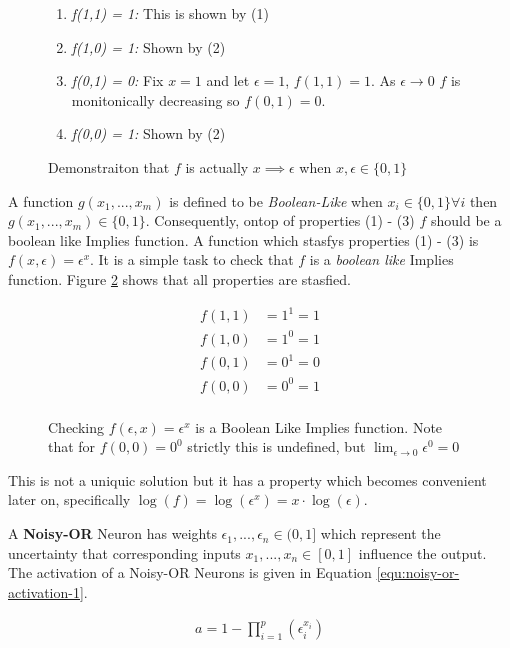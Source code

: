 \begin{figure}[H]
\begin{enumerate}
\item \textit{f(1,1) = 1:} This is shown by (1)
\item \textit{f(1,0) = 1:} Shown by (2)
\item \textit{f(0,1) = 0:} Fix $x = 1$ and let $\epsilon = 1$, $f(1,1) = 1$. As $\epsilon \rightarrow 0 $ $f$ is monitonically decreasing so $f(0,1) = 0$.
\item \textit{f(0,0) = 1:} Shown by (2)
\end{enumerate}
\caption{Demonstraiton that $f$ is actually $x \implies \epsilon$ when $x,\epsilon \in \{0, 1\}$}
\label{fig:f-actually-implies}
\end{figure}
A function $g(x_1, ..., x_m)$ is defined to be \textit{Boolean-Like} \cite{williams1986logic} when $x_i \in \{0, 1\} \forall i$ then $g(x_1, ..., x_m) \in \{0, 1\}$. Consequently, ontop of properties (1) - (3) $f$ should be a boolean like Implies function. A function which stasfys properties (1) - (3) is $f(x, \epsilon) = \epsilon^x$. It is a simple task to check that $f$ is a \textit{boolean like} Implies function. Figure \ref{fig:f-check-implies} shows that all properties are stasfied.

\begin{figure}[H]
\begin{align*}
f(1,1) &= 1^1 = 1\\
f(1,0) &= 1^0 = 1\\
f(0,1) &= 0^1 = 0\\
f(0,0) &= 0^0 = 1\\
\end{align*}
\caption{Checking $f(\epsilon, x) = \epsilon^x$ is a Boolean Like Implies function. Note that for $f(0,0) = 0^0$ strictly this is undefined, but $\lim_{\epsilon \rightarrow 0} \epsilon^0 = 0$}
\label{fig:f-check-implies}
\end{figure}

This is not a uniquic solution but it has a property which becomes convenient later on, specifically $\log(f) = \log(\epsilon^x) = x \cdot \log(\epsilon)$.

\begin{definition}
	A \textbf{Noisy-OR} Neuron has weights $\epsilon_1, ..., \epsilon_n \in (0,1]$ which represent the uncertainty that corresponding inputs $x_1, ..., x_n \in [0,1]$ influence the output. The activation of a Noisy-OR Neurons is given in Equation \ref{equ:noisy-or-activation-1}.
	
	\begin{align}
	a = 1 - \prod^p_{i=1} (\epsilon_i^{x_i})
	\label{equ:noisy-or-activation-1}
	\end{align}
\end{definition}

